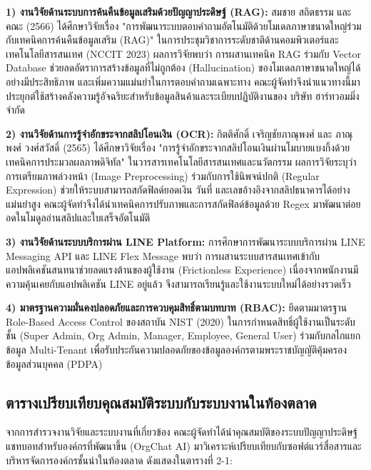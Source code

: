 \hspace*{1.3em}
\textbf{1) งานวิจัยด้านระบบการค้นคืนข้อมูลเสริมด้วยปัญญาประดิษฐ์ (RAG):} สมชาย สถิตธรรม และคณะ (2566) ได้ศึกษาวิจัยเรื่อง "การพัฒนาระบบตอบคำถามอัตโนมัติด้วยโมเดลภาษาขนาดใหญ่ร่วมกับเทคนิคการค้นคืนข้อมูลเสริม (RAG)" ในการประชุมวิชาการระดับชาติด้านคอมพิวเตอร์และเทคโนโลยีสารสนเทศ (NCCIT 2023) ผลการวิจัยพบว่า การผสานเทคนิค RAG ร่วมกับ Vector Database ช่วยลดอัตราการสร้างข้อมูลที่ไม่ถูกต้อง (Hallucination) ของโมเดลภาษาขนาดใหญ่ได้อย่างมีประสิทธิภาพ และเพิ่มความแม่นยำในการตอบคำถามเฉพาะทาง คณะผู้จัดทำจึงนำแนวทางนี้มาประยุกต์ใช้สร้างคลังความรู้อัจฉริยะสำหรับข้อมูลสินค้าและระเบียบปฏิบัติงานของ บริษัท ฮาร์ทวอมมิ่ง จำกัด

\hspace*{1.3em}
\textbf{2) งานวิจัยด้านการรู้จำอักขระจากสลิปโอนเงิน (OCR):} กิตติศักดิ์ เจริญชัยภาณุพงศ์ และ ภาณุพงศ์ วงศ์สวัสดิ์ (2565) ได้ศึกษาวิจัยเรื่อง "การรู้จำอักขระจากสลิปโอนเงินผ่านโมบายแบงกิ้งด้วยเทคนิคการประมวลผลภาพดิจิทัล" ในวารสารเทคโนโลยีสารสนเทศและนวัตกรรม ผลการวิจัยระบุว่า การเตรียมภาพล่วงหน้า (Image Preprocessing) ร่วมกับการใช้นิพจน์ปกติ (Regular Expression) ช่วยให้ระบบสามารถสกัดฟิลด์ยอดเงิน วันที่ และเลขอ้างอิงจากสลิปธนาคารได้อย่างแม่นยำสูง คณะผู้จัดทำจึงได้นำเทคนิคการปรับภาพและการสกัดฟิลด์ข้อมูลด้วย Regex มาพัฒนาต่อยอดในโมดูลอ่านสลิปและใบเสร็จอัตโนมัติ

\hspace*{1.3em}
\textbf{3) งานวิจัยด้านระบบบริการผ่าน LINE Platform:} การศึกษาการพัฒนาระบบบริการผ่าน LINE Messaging API และ LINE Flex Message พบว่า การผสานระบบสารสนเทศเข้ากับแอปพลิเคชันสนทนาช่วยลดแรงต้านของผู้ใช้งาน (Frictionless Experience) เนื่องจากพนักงานมีความคุ้นเคยกับแอปพลิเคชัน LINE อยู่แล้ว จึงสามารถเรียนรู้และใช้งานระบบใหม่ได้อย่างรวดเร็ว

\hspace*{1.3em}
\textbf{4) มาตรฐานความมั่นคงปลอดภัยและการควบคุมสิทธิ์ตามบทบาท (RBAC):} ยึดตามมาตรฐาน Role-Based Access Control ของสถาบัน NIST (2020) ในการกำหนดสิทธิ์ผู้ใช้งานเป็นระดับชั้น (Super Admin, Org Admin, Manager, Employee, General User) ร่วมกับกลไกแยกข้อมูล Multi-Tenant เพื่อรับประกันความปลอดภัยของข้อมูลองค์กรตามพระราชบัญญัติคุ้มครองข้อมูลส่วนบุคคล (PDPA)

\subsection{ตารางเปรียบเทียบคุณสมบัติระบบกับระบบงานในท้องตลาด}
\hspace*{1.3em}
จากการสำรวจงานวิจัยและระบบงานที่เกี่ยวข้อง คณะผู้จัดทำได้นำคุณสมบัติของระบบปัญญาประดิษฐ์แชทบอทสำหรับองค์กรที่พัฒนาขึ้น (OrgChat AI) มาวิเคราะห์เปรียบเทียบกับซอฟต์แวร์สื่อสารและบริหารจัดการองค์กรชั้นนำในท้องตลาด ดังแสดงในตารางที่ 2-1:

